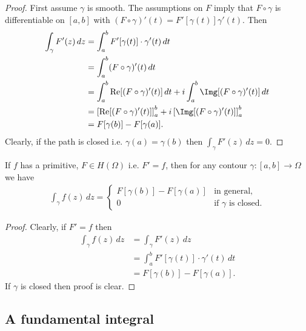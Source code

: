 \documentclass[12pt, a4paper]{article}
\DeclareMathOperator{\R}{Re}
\begin{document}
\begin{proof}
    First assume \(\gamma\) is smooth. The assumptions on \(F\) imply that \(F \circ \gamma\) is differentiable on \([a,b]\) with \((F \circ \gamma)'(t) =F'[\gamma(t)]\gamma'(t)\). Then 
    \[\begin{aligned}
        \int_{\gamma} F'(z) \, dz &= \int_{a}^{b} F'[\gamma(t)]\cdot \gamma'(t) \, dt\\
        &= \int_{a}^{b} (F \circ \gamma)'(t) \, dt \\
        &= \int_{a}^{b} \R[(F \circ \gamma)'(t)] \, dt + i \int_{a}^{b} \Img[(F \circ \gamma)'(t)] \, dt \\
        &= \left[ \R[(F \circ \gamma)'(t)] \right]_a^b+i\left[ \Img[(F \circ \gamma)'(t)] \right]_a^b \\
        &= F[\gamma(b)]-F[\gamma(a)].
    \end{aligned}\]
    Clearly, if the path is closed i.e. \(\gamma(a)= \gamma(b)\) then \(\int_{\gamma} F'(z) \, dz =0\).
\end{proof}

\begin{mdcor}
    If \(f\) has a primitive, \(F \in H(\Omega)\) i.e. \(F'=f\), then for any contour \(\gamma:[a,b] \to \Omega\) we have
    \[\begin{aligned}
        \int_{\gamma} f(z) \, dz = \begin{cases}
            F[\gamma(b)]-F[\gamma(a)]   &\text{in general,} \\
            0   &\text{if \(\gamma\) is closed.}
        \end{cases}
    \end{aligned}\]
\end{mdcor}

\begin{proof}
    Clearly, if \(F'=f\) then 
    \[\begin{aligned}
        \int_{\gamma} f(z) \, dz &= \int_{\gamma} F'(z) \, dz \\
        &= \int_{a}^{b} F'[\gamma(t)] \cdot \gamma'(t) \, dt \\
        &= F[\gamma(b)]-F[\gamma(a)].
    \end{aligned}\]
    If \(\gamma\) is closed then proof is clear.
\end{proof}

\subsection{A fundamental integral}
\end{document}
